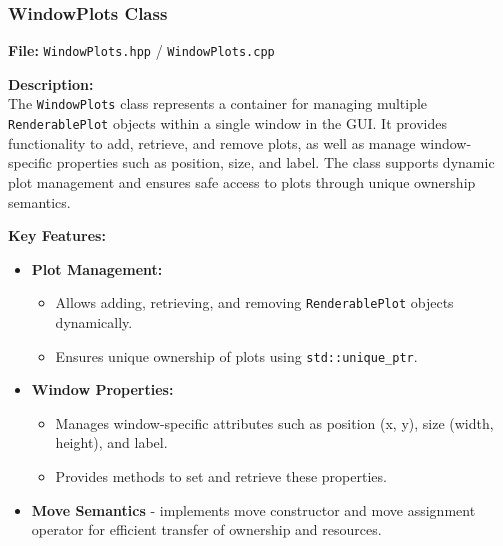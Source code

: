 \documentclass{article}
\begin{document}
\vspace{10pt}
\subsubsection{WindowPlots Class}
\textbf{File:} \texttt{WindowPlots.hpp} / \texttt{WindowPlots.cpp} 

\vspace{5pt}
\noindent
\textbf{Description:}
\\
\noindent
The \texttt{WindowPlots} class represents a container for managing multiple \texttt{RenderablePlot} objects within a single window in the GUI. It provides functionality to add, retrieve, and remove plots, as well as manage window-specific properties such as position, size, and label. The class supports dynamic plot management and ensures safe access to plots through unique ownership semantics.

\vspace{5pt}
\noindent
\textbf{Key Features:}
\begin{itemize}
    \item \textbf{Plot Management:}
    \begin{itemize}
        \item Allows adding, retrieving, and removing \texttt{RenderablePlot} objects dynamically.

        \item Ensures unique ownership of plots using \texttt{std::unique\_ptr}.
    \end{itemize}
    
    \item \textbf{Window Properties:}
    \begin{itemize}
        \item Manages window-specific attributes such as position (x, y), size (width, height), and label.

        \item Provides methods to set and retrieve these properties.
    \end{itemize}
    
    \item \textbf{Move Semantics} - implements move constructor and move assignment operator for efficient transfer of ownership and resources.
\end{itemize}
\end{document}
